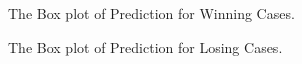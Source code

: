 \begin{figure}[!h]
	\begin{center}
	\end{center}
	\caption{\label{fig:lostcase}The Box plot of Prediction for Winning Cases.}
\end{figure}


\begin{figure}[!h]
	\begin{center}
	\end{center}
	\caption{\label{fig:lostcase}The Box plot of Prediction for Losing Cases.}
\end{figure}